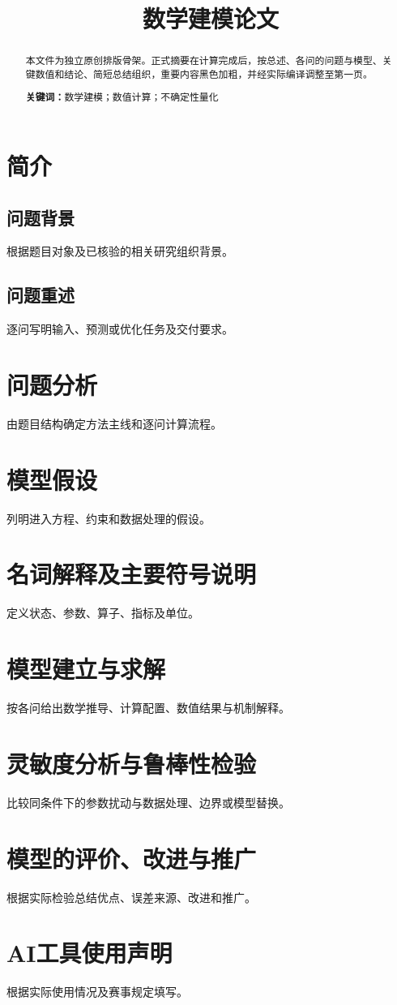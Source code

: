 \documentclass[UTF8,a4paper,12pt]{ctexart}
\title{数学建模论文}
\author{}\date{}
\newcommand{\keywords}[1]{\par\medskip\noindent\textbf{关键词：}#1}
\begin{document}
\maketitle
\begin{abstract}
本文件为独立原创排版骨架。正式摘要在计算完成后，按总述、各问的问题与模型、关键数值和结论、简短总结组织，重要内容黑色加粗，并经实际编译调整至第一页。
\keywords{数学建模；数值计算；不确定性量化}
\end{abstract}
\clearpage
\tableofcontents
\clearpage
\section{简介}
\subsection{问题背景}
根据题目对象及已核验的相关研究组织背景。
\subsection{问题重述}
逐问写明输入、预测或优化任务及交付要求。
\section{问题分析}
由题目结构确定方法主线和逐问计算流程。
\section{模型假设}
列明进入方程、约束和数据处理的假设。
\section{名词解释及主要符号说明}
定义状态、参数、算子、指标及单位。
\section{模型建立与求解}
按各问给出数学推导、计算配置、数值结果与机制解释。
\section{灵敏度分析与鲁棒性检验}
比较同条件下的参数扰动与数据处理、边界或模型替换。
\section{模型的评价、改进与推广}
根据实际检验总结优点、误差来源、改进和推广。
\section*{AI工具使用声明}
根据实际使用情况及赛事规定填写。


\end{document}
